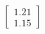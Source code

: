 \documentclass[preview]{standalone}
\begin{document}
\begin{align*}
\begin{bmatrix} 1.21 \\ 1.15 \end{bmatrix}
\end{align*}
\end{document}
